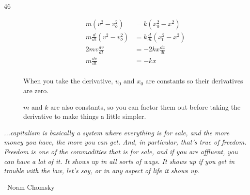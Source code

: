 \documentclass{exam}
\begin{document}
\begin{description}

\item[46]
\begin{align*}
  m(v^2 - v_o^2) &= k(x_0^2 - x^2) \\
  m \frac{d}{dt} (v^2 - v_o^2) &= k \frac{d}{dt}(x_0^2 - x^2)  \\
  2mv \frac{dv}{dt} &= -2kx \frac{dx}{dt}  \\
  m \frac{dv}{dt} &= -kx \\
\end{align*}

When you take the derivative, $v_0$ and $x_0$ are constants so their derivatives are zero.  

$m$ and $k$ are also constants, so you can factor them out before taking the derivative to make things a little simpler.

\end{description}


\else

\vspace{9 cm}

{\em ...capitalism is basically a system where everything is for sale, and the more money you have, the more you can
  get. And, in particular, that's true of freedom. Freedom is one of the commodities that is for sale, and if you are
  affluent, you can have a lot of it. It shows up in all sorts of ways. It shows up if you get in trouble with the law,
  let's say, or in any aspect of life it shows up.}

\vspace{.2 cm}

\hspace{1 cm} --Noam Chomsky


\fi
\end{document}
